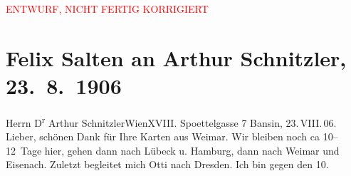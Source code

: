 
\begin{center}
            \textcolor{red}{ENTWURF, NICHT FERTIG KORRIGIERT}
                      \end{center}
            
         
         \renewcommand{\erwaehntePersonen}{Personen: Richard Metzl, Ottilie Salten}
         \renewcommand{\erwaehnteOrte}{Orte: Adriatisches Meer, Bansin, Dresden, Edmund-Weiß-Gasse, Eisenach, Hamburg, Kantstraße, Lübeck, Reichenau an der Rax, Venedig, Weimar, Wien}
         \renewcommand{\erwaehnteWerke}{}
               \section[Felix Salten an Arthur Schnitzler, 23. 8. 1906]{ Felix Salten an Arthur Schnitzler, 23. 8. 1906}\nopagebreak{}\rehead{ }\begin{ledgroupsized}[t]{13cm}\normalsize\beginnumbering \toendnotes[C]{\smallbreak\pagebreak[2]} 
\toendnotes[C]{\smallbreak}\pstart{}{\pb}Herrn D\textsuperscript{r} Arthur Schnitzler\pend{}\pstart{}Wien\pend{}\pstart{}XVIII. Spoettelgasse 7\pend{}{\bigskip}\pstart
           \raggedleft{}{\pb}Bansin, 23. VIII. 06.
               \pend
           \pstart
           Lieber, schönen Dank für Ihre Karten aus Weimar. Wir bleiben noch ca 10–12 Tage hier, gehen dann nach Lübeck u. Hamburg, dann
               nach Weimar und Eisenach. Zuletzt begleitet mich Otti
               nach Dresden. Ich bin gegen den 10.

\end{ledgroupsized}
